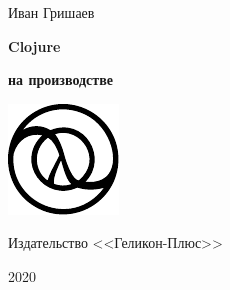 
\begin{titlepage}

\begin{center}

  {Иван Гришаев}

  \vspace*{5cm}

  {\Huge\textbf{Clojure}}

  \vspace{1mm}

  {\Large\textbf{на производстве}}

  \vspace{10mm}

  \includegraphics{logo-gray.pdf}

  \vspace*{\fill}

  {Издательство <<Геликон-Плюс>>}

  {2020}

\end{center}

\end{titlepage}
